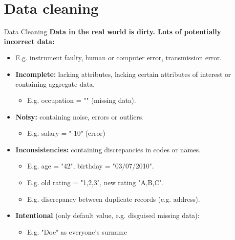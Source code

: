 \section{Data cleaning}

\begin{frame}{Data Cleaning}
	\textbf{Data in the real world is {\color{airforceblue}dirty}. Lots of
		potentially incorrect data:}
	\begin{itemize}
		\item E.g. instrument faulty, human or computer error, transmission
		      error.
		\item \textbf{\color{airforceblue}Incomplete:} lacking attributes,
		      lacking certain attributes of interest or containing aggregate data.
		      \begin{itemize}
			      \item E.g. occupation = "" (missing data).
		      \end{itemize}
		\item \textbf{\color{airforceblue}Noisy:} containing noise, errors or
		      outliers.
		      \begin{itemize}
			      \item E.g. salary = "-10" (error)
		      \end{itemize}
		\item \textbf{\color{airforceblue}Inconsistencies:} containing
		      discrepancies in codes or names.
		      \begin{itemize}
			      \item E.g. age = "42", birthday = "03/07/2010".
			      \item E.g. old rating = "1,2,3", new rating "A,B,C".
			      \item E.g. discrepancy between duplicate records (e.g. address).
		      \end{itemize}
		\item \textbf{\color{airforceblue}Intentional} (only default value,
		      e.g. disguised missing data):
		      \begin{itemize}
			      \item E.g. "Doe" as everyone's surname
		      \end{itemize}
	\end{itemize}
\end{frame}

